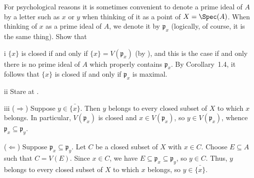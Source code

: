 \begin{exercise}
For psychological reasons it is sometimes convenient to denote a prime ideal of \(A\) by a letter such as \(x\) or \(y\) when thinking of it as a point of \(X = \Spec(A)\).
When thinking of \(x\) as a prime ideal of \(A\), we denote it by \(\mathfrak p_x\) (logically, of course, it is the same thing).
Show that
\end{exercise}

\begin{partsolution}{i}
\(\{x\}\) is closed if and only if \(\{x\} = V(\mathfrak{p}_x)\) (by ), and this is the case if and only there is no prime ideal of \(A\) which properly contains \(\mathfrak{p}_x\).
By Corollary~1.4, it follows that \(\{x\}\) is closed if and only if \(\mathfrak{p}_x\) is maximal.
\end{partsolution}

\begin{partsolution}{ii}
Stare at .
\end{partsolution}

\begin{partsolution}{iii}
(\(\Rightarrow\))
Suppose \(y \in \bar{\{x\}}\).
Then \(y\) belongs to every closed subset of \(X\) to which \(x\) belongs.
In particular, \(V(\mathfrak{p}_x)\) is closed and \(x \in V(\mathfrak{p}_x)\), so \(y \in V(\mathfrak{p}_x)\), whence \(\mathfrak{p}_x \subseteq \mathfrak{p}_y\).

(\(\Leftarrow\))
Suppose \(\mathfrak{p}_x \subseteq \mathfrak{p}_y\).
Let \(C\) be a closed subset of \(X\) with \(x \in C\).
Choose \(E \subseteq A\) such that \(C = V(E)\).
Since \(x \in C\), we have \(E \subseteq \mathfrak{p}_x \subseteq \mathfrak{p}_y\), so \(y \in C\).
Thus, \(y\) belongs to every closed subset of \(X\) to which \(x\) belongs, so \(y \in \bar{\{x\}}\).
\end{partsolution}

